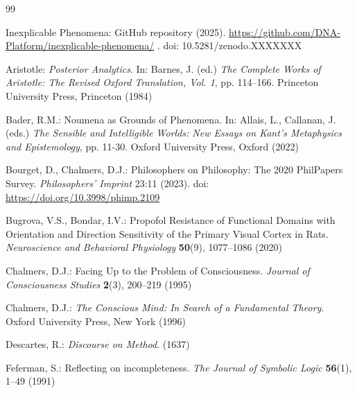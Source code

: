 \documentclass[runningheads]{llncs}
\newcommand{\link}[2]{%
\href{#1}{\textcolor{wikiblue}{#2}\xspace}%
}
\begin{document}

\begin{thebibliography}{99}

Inexplicable Phenomena: GitHub repository (2025). \link{https://github.com/DNA-Platform/inexplicable-phenomena/}{https://github.com/DNA-Platform/inexplicable-phenomena/}. doi: 10.5281/zenodo.XXXXXXX


Aristotle: \textit{Posterior Analytics}. In: Barnes, J. (ed.) \textit{The Complete Works of Aristotle: The Revised Oxford Translation, Vol. 1}, pp. 114--166. Princeton University Press, Princeton (1984)

Bader, R.M.: Noumena as Grounds of Phenomena. In: Allais, L., Callanan, J. (eds.) \textit{The Sensible and Intelligible Worlds: New Essays on Kant's Metaphysics and Epistemology}, pp. 11-30. Oxford University Press, Oxford (2022)

Bourget, D., Chalmers, D.J.: Philosophers on Philosophy: The 2020 PhilPapers Survey. \textit{Philosophers' Imprint} 23:11 (2023). doi: \link{https://doi.org/10.3998/phimp.2109}{https://doi.org/10.3998/phimp.2109}

Bugrova, V.S., Bondar, I.V.: Propofol Resistance of Functional Domains with Orientation and Direction Sensitivity of the Primary Visual Cortex in Rats. \textit{Neuroscience and Behavioral Physiology} \textbf{50}(9), 1077--1086 (2020)

Chalmers, D.J.: Facing Up to the Problem of Consciousness. \textit{Journal of Consciousness Studies} \textbf{2}(3), 200--219 (1995)

Chalmers, D.J.: \textit{The Conscious Mind: In Search of a Fundamental Theory}. Oxford University Press, New York (1996)

Descartes, R.: \textit{Discourse on Method}. (1637)


Feferman, S.: Reflecting on incompleteness. \textit{The Journal of Symbolic Logic} \textbf{56}(1), 1--49 (1991)


\end{thebibliography}
\end{document}
